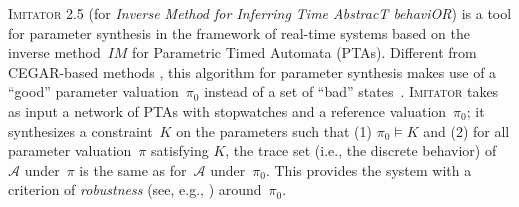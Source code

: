\documentclass{llncs}
\newcommand{\A}{\mathcal{A}}
\newcommand{\Ko}{K}
\newcommand{\pio}{\pi_0}
\newcommand{\piprime}{\pi}
\newcommand{\IM}{\mathit{IM}}
\newcommand{\hytech}{{\sc HyTech}}
\newcommand{\imitator}{\textsc{Imitator}}
\begin{document}
\imitator{} 2.5 (for \emph{Inverse Method for Inferring Time AbstracT behaviOR}) is a tool for parameter synthesis in the framework of real-time systems based on the inverse method~$\IM$ for Parametric Timed Automata (PTAs).  %
Different from CEGAR-based methods%
, this algorithm for parameter synthesis makes use of a ``good'' parameter valuation~$\pio$ instead of a set of ``bad'' states~\cite{acef09}.
\imitator{} takes as input a network of PTAs with stopwatches
and a reference valuation~$\pio$; it synthesizes a constraint~$\Ko$ on the parameters such that (1) $\pio \models \Ko$ and (2) for all parameter valuation~$\piprime$ satisfying $\Ko$, the trace set (i.e., the discrete behavior) of~$\A$ under~$\piprime$ is the same as for~$\A$ under~$\pio$.
This provides the system with a criterion of \emph{robustness} (see, e.g., \cite{m11})
around~$\pio$.


\end{document}
